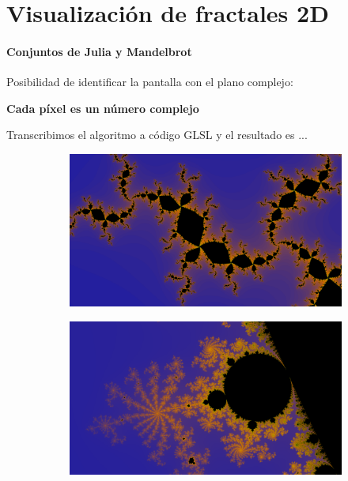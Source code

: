 \begin{frame}{\insertsectionhead}
    
\end{frame}

\section{Visualización de fractales 2D}
\begin{frame}{\insertsectionhead}
    \framesubtitle{Conjuntos de Julia y Mandelbrot}
    {\large
    Posibilidad de identificar la pantalla con el plano complejo:
    
    \pause
    
    \centering\textbf{Cada píxel es un número complejo}
    
    
    Transcribimos el algoritmo a código GLSL y el resultado es ...}
    
    \begin{figure}[ht!]
    \hspace{\fill}
    \begin{subfigure}[b]{0.4\textwidth}
      \includegraphics[width=\textwidth]{screenshots/julia-WEBGL.png}
    \end{subfigure}
    \hspace{\fill}
    \begin{subfigure}[b]{0.4\textwidth}
      \includegraphics[width=\textwidth]{screenshots/mandelbrot-WEBGL.png}
    \end{subfigure}
    \hspace{\fill}
    \end{figure}
    
\end{frame}

